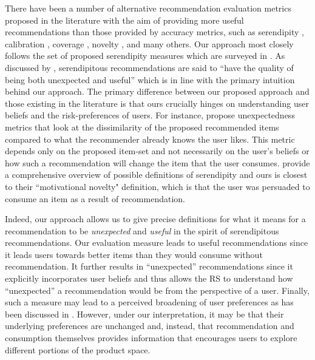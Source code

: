 \documentclass[sigconf]{acmart}
\begin{document}
 
There have been a number of alternative recommendation evaluation metrics proposed in the literature with the aim of providing more useful recommendations than those provided by accuracy metrics, such as serendipity \cite{kotkov2016survey}, calibration \cite{steck2018calibrated}, coverage \cite{ge2010beyond}, novelty \cite{vargas2011rank}, and many others. Our approach most closely follows the set of proposed serendipity measures which are surveyed in \cite{kotkov2016survey}. As discussed by \cite{maksai2015predicting}, serendipitous recommendations are said to ``have the quality of being both unexpected and useful'' which is in line with the primary intuition behind our approach. The primary difference between our proposed approach and those existing in the literature is that ours crucially hinges on understanding user beliefs and the risk-preferences of users. For instance, \cite{vargas2011rank, kaminskas2014measuring} propose unexpectedness metrics that look at the dissimilarity of the proposed recommended items compared to what the recommender already knows the user likes. This metric depends only on the proposed item-set and not necessarily on the user's beliefs or how such a recommendation will change the item that the user consumes. \cite{kotkov2018investigating} provide a comprehensive overview of possible definitions of serendipity and ours is closest to their ``motivational novelty" definition, which is that the user was persuaded to consume an item as a result of recommendation.

 
Indeed, our approach allows us to give precise definitions for what it means for a recommendation to be \textit{unexpected} and \textit{useful} in the spirit of serendipitous recommendations. Our evaluation measure leads to useful recommendations since it leads users towards better items than they would consume without recommendation. It further results in ``unexpected'' recommendations since it explicitly incorporates user beliefs and thus allows the RS to understand how ``unexpected'' a recommendation would be from the perspective of a user.  Finally, such a measure may lead to a perceived broadening of user preferences as has been discussed in \cite{herlocker2004evaluating, zhang2012auralist}. However, under our interpretation, it may be that their underlying preferences are unchanged and, instead, that recommendation and consumption themselves provides information that encourages users to explore different portions of the product space.


\end{document}
